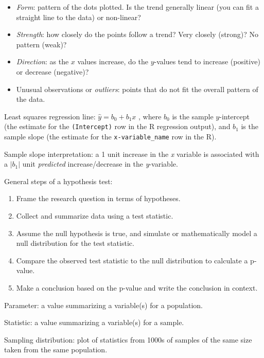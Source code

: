\documentclass[
]{report}
\providecommand{\tightlist}{%
  \setlength{\itemsep}{0pt}\setlength{\parskip}{0pt}}
\begin{document}
\begin{itemize}
\tightlist
\item
  \emph{Form}: pattern of the dots plotted. Is the trend generally linear (you can fit a straight line to the data) or non-linear?\\
\item
  \emph{Strength}: how closely do the points follow a trend? Very closely (strong)? No pattern (weak)?\\
\item
  \emph{Direction}: as the \(x\) values increase, do the \(y\)-values tend to increase (positive) or decrease (negative)?\\
\item
  Unusual observations or \emph{outliers}: points that do not fit the overall pattern of the data.
\end{itemize}


Least squares regression line: \(\hat{y} = b_0+b_1x\) , where \(b_0\) is the sample \(y\)-intercept (the estimate for the \texttt{(Intercept)} row in the R regression output), and \(b_1\) is the sample slope (the estimate for the \texttt{x-variable\_name} row in the R).

Sample slope interpretation: a 1 unit increase in the \emph{x} variable is associated with a \(|b_1 |\) unit \emph{predicted} increase/decrease in the \emph{y}-variable.

General steps of a hypothesis test:

\begin{enumerate}
\def\labelenumi{\arabic{enumi}.}
\item
  Frame the research question in terms of hypotheses.
\item
  Collect and summarize data using a test statistic.
\item
  Assume the null hypothesis is true, and simulate or mathematically model a null distribution for the test statistic.
\item
  Compare the observed test statistic to the null distribution to calculate a p-value.
\item
  Make a conclusion based on the p-value and write the conclusion in context.
\end{enumerate}

Parameter: a value summarizing a variable(s) for a population.

Statistic: a value summarizing a variable(s) for a sample.

Sampling distribution: plot of statistics from 1000s of samples of the same size taken from the same population.
\end{document}
